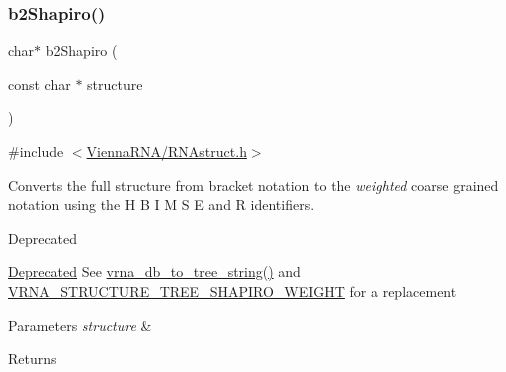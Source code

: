 \subsubsection{\texorpdfstring{b2\+Shapiro()}{b2Shapiro()}}
{\footnotesize\ttfamily char$\ast$ b2\+Shapiro (\begin{DoxyParamCaption}\item[{const char $\ast$}]{structure }\end{DoxyParamCaption})}



{\ttfamily \#include $<$\hyperlink{RNAstruct_8h}{Vienna\+R\+N\+A/\+R\+N\+Astruct.\+h}$>$}



Converts the full structure from bracket notation to the {\itshape weighted} coarse grained notation using the \textquotesingle{}H\textquotesingle{} \textquotesingle{}B\textquotesingle{} \textquotesingle{}I\textquotesingle{} \textquotesingle{}M\textquotesingle{} \textquotesingle{}S\textquotesingle{} \textquotesingle{}E\textquotesingle{} and \textquotesingle{}R\textquotesingle{} identifiers. 

\begin{DoxyRefDesc}{Deprecated}
\item[\hyperlink{deprecated__deprecated000128}{Deprecated}]See \hyperlink{group__struct__utils__tree_ga56551ab7da64933a7230d29430f40cfe}{vrna\+\_\+db\+\_\+to\+\_\+tree\+\_\+string()} and \hyperlink{group__struct__utils__tree_ga91f2e3a3a502d5445fd7fe5983a5fe92}{V\+R\+N\+A\+\_\+\+S\+T\+R\+U\+C\+T\+U\+R\+E\+\_\+\+T\+R\+E\+E\+\_\+\+S\+H\+A\+P\+I\+R\+O\+\_\+\+W\+E\+I\+G\+HT} for a replacement\end{DoxyRefDesc}



\begin{DoxyParams}{Parameters}
{\em structure} & \\
\hline
\end{DoxyParams}
\begin{DoxyReturn}{Returns}

\end{DoxyReturn}
\mbox{\label{group__struct__utils__deprecated_ga880d33066dd95441e5fbb73c57ed1c3e}} 
